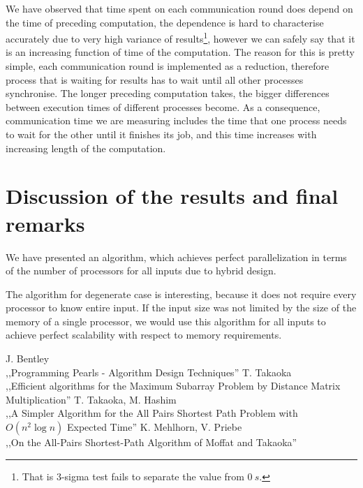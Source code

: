 We have observed that time spent on each communication round does depend on the time of preceding computation, the dependence is hard to characterise accurately due to very high variance of results\footnote{That is $3$-sigma test fails to separate the value from $\SI{0}{s}$.}, however we can safely say that it is an increasing function of time of the computation.
The reason for this is pretty simple, each communication round is implemented as a reduction, therefore process that is waiting for results has to wait until all other processes synchronise.
The longer preceding computation takes, the bigger differences between execution times of different processes become.
As a consequence, communication time we are measuring includes the time that one process needs to wait for the other until it finishes its job, and this time increases with increasing length of the computation.

\section*{Discussion of the results and final remarks}

We have presented an algorithm, which achieves perfect parallelization in terms of the number of processors for all inputs due to hybrid design.

The algorithm for degenerate case is interesting, because it does not require every processor to know entire input.
If the input size was not limited by the size of the memory of a single processor, we would use this algorithm for all inputs to achieve perfect scalability with respect to memory requirements.


\FloatBarrier
\begin{thebibliography}{9}
     J. Bentley \\
        \newblock ,,Programming Pearls - Algorithm Design Techniques''
     T. Takaoka \\
        \newblock ,,Efficient algorithms for the Maximum Subarray Problem by Distance Matrix Multiplication''
     T. Takaoka, M. Hashim \\
        \newblock ,,A Simpler Algorithm for the All Pairs Shortest Path Problem with $O(n^2 \log{n})$ Expected Time''
     K. Mehlhorn, V. Priebe \\
        \newblock ,,On the All-Pairs Shortest-Path Algorithm of Moffat and Takaoka''
\end{thebibliography}

